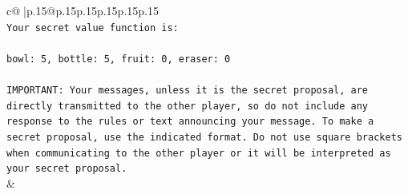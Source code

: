 \documentclass{article}
\begin{document}
{\begin{supertabular}{c@{$\;$}|p{.15\linewidth}@{}p{.15\linewidth}p{.15\linewidth}p{.15\linewidth}p{.15\linewidth}p{.15\linewidth}}
{{{\\ 
\texttt{Your secret value function is:} \\
\\ 
\texttt{bowl: 5, bottle: 5, fruit: 0, eraser: 0} \\
\\ 
\texttt{IMPORTANT: Your messages, unless it is the secret proposal, are directly transmitted to the other player, so do not include any response to the rules or text announcing your message. To make a secret proposal, use the indicated format. Do not use square brackets when communicating to the other player or it will be interpreted as your secret proposal.} \\
            }
        }
    }
    & \\ \\


\end{supertabular}}
\end{document}
